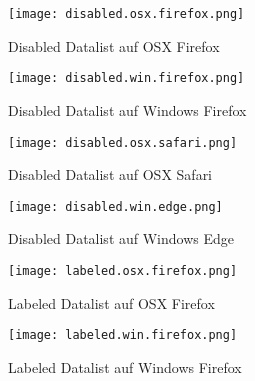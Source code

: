 \begin{figure}[!htb]
    \centering
    \begin{minipage}[b]{0.45\textwidth}
        \centering
        \texttt{[image: disabled.osx.firefox.png]}
        \caption{\centering Disabled Datalist auf OSX Firefox}
        \label{img:disabledOsxFirefoxDatalist}
    \end{minipage}
    \hfill
    \begin{minipage}[b]{0.45\textwidth}
        \centering
        \texttt{[image: disabled.win.firefox.png]}
        \caption{\centering Disabled Datalist auf Windows Firefox}
        \label{img:disabledWinFirefoxDatalist}
    \end{minipage}
\end{figure}

\begin{figure}[!htb]
    \centering
    \begin{minipage}[b]{0.45\textwidth}
        \centering
        \texttt{[image: disabled.osx.safari.png]}
        \caption{\centering Disabled Datalist auf OSX Safari}
        \label{img:disabledOsxSafariDatalist}
    \end{minipage}
    \hfill
    \begin{minipage}[b]{0.45\textwidth}
        \centering
        \texttt{[image: disabled.win.edge.png]}
        \caption{\centering Disabled Datalist auf Windows Edge}
        \label{img:disabledWinEdgeDatalist}
    \end{minipage}
\end{figure}


\begin{figure}[!htb]
    \centering
    \begin{minipage}[b]{0.45\textwidth}
        \centering
        \texttt{[image: labeled.osx.firefox.png]}
        \caption{\centering Labeled Datalist auf OSX Firefox}
        \label{img:labeledOsxFirefoxDatalist}
    \end{minipage}
    \hfill
    \begin{minipage}[b]{0.45\textwidth}
        \centering
        \texttt{[image: labeled.win.firefox.png]}
        \caption{\centering Labeled Datalist auf Windows Firefox}
        \label{img:labeledWinFirefoxDatalist}
    \end{minipage}
\end{figure}

